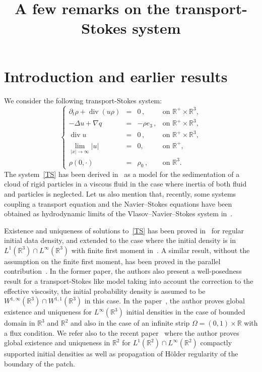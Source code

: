 \documentclass[AHL,Unicode,longabstracts,published]{cedram}
\title{A few remarks on the transport-Stokes system}
\author[\initial{A.} \lastname{Mecherbet}]{\firstname{Amina} \lastname{Mecherbet}}
\author[\initial{F.} \lastname{Sueur}]{\firstname{Franck} \lastname{Sueur}}
\newcommand{\R}{\mathbb{R}}
\renewcommand{\div}{\operatorname{div}}
\begin{document}
\maketitle


\section{Introduction and earlier results}

We consider the following transport-Stokes system:
\begin{equation}\label{TS}
\left\{
\begin{array}{rcll}
\partial_t \rho+{\div}(u \rho) &=& 0\,,& \text{on }\R^+ \times \R^3,\\
- \Delta u+ \nabla q &=& - \rho e_3 \,,& \text{on }\R^+ \times \R^3,\\
\div u & =&0\,,& \text{on }\R^+ \times \R^3,\\
\underset{|x|\to \infty}{\lim}|u| &=& 0,& \text{on } \R^+,\\
\rho(0,\cdot) &= & \rho_0 \,,&\text{on } \R^3.
\end{array}
\right.
\end{equation}
The system~\eqref{TS} has been derived in~\cite{Hofer, Mecherbet} as a model for the sedimentation of a cloud of rigid particles in a viscous fluid in the case where inertia of both fluid and particles is neglected. Let us also mention that, recently, some systems coupling a transport equation and the Navier--Stokes equations have been obtained as hydrodynamic limits of the Vlasov--Navier--Stokes system in~\cite{HKM}.

Existence and uniqueness of solutions to~\eqref{TS} has been proved in~\cite{Hofer} for regular initial data density, and extended to the case where the initial density is in $L^1(\R^3) \cap L^\infty(\R^3)$ with finite first moment in~\cite{Mecherbet2}. A similar result, without the assumption on the finite first moment, has been proved in the parallel contribution~\cite{Hofer&Schubert}. In the former paper, the authors also present a well-posedness result for a transport-Stokes like model taking into account the correction to the effective viscosity, the initial probability density is assumed to be $W^{1,\infty}(\R^3)\cap W^{1,1}(\R^3) $ in this case. In the paper~\cite{Leblond}, the author proves global existence and uniqueness for $L^\infty(\R^3)$ initial densities in the case of bounded domain in $\R^3$ and $\R^2$ and also in the case of an infinite strip $\Omega= (0,1)\times \R$ with a flux condition. We refer also to the recent paper~\cite{GrayerII} where the author proves global existence and uniqueness in $\R^2$ for $L^1(\R^2)\cap L^\infty(\R^2)$ compactly supported initial densities as well as propagation of H\"older regularity of the boundary of the patch.
\end{document}
